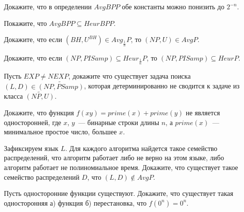 \setcounter{curtask}{18}


\begin{task}
    Докажите, что в определении $AvgBPP$ обе константы  можно понизить до $2^{-n}$.
\end{task}

\begin{task}
    Покажите, что $AvgBPP \subseteq HeurBPP$.
\end{task}

\begin{task}
    Докажите, что если $(BH, U^{BH}) \in Avg_{\frac{1}{n}}P$, то $(NP, U) \in AvgP$.
\end{task}

\begin{task}
    Докажите, что если $(NP, PISamp) \subseteq Heur_{\frac{1}{n}}P$, то $(NP, PISamp)
    \subseteq HeurP$.
\end{task}

\begin{task}
    Пусть $EXP \neq NEXP$, докажите что существует задача поиска $(L, D) \in
    \widetilde{(NP, PSamp)}$,
    которая детерминированно не сводится к задаче из класса $\widetilde{(NP, U)}$.
\end{task}

\breakline

\begin{ptask}{12}
    Докажите, что функция $f(xy) = prime(x) + prime(y)$ не является односторонней,
    где $x$, $y$~--- бинарные строки длины $n$, а $prime(x)$~--- минимальное простое
    число, большее $x$.
\end{ptask}

\begin{ptask}{14}
    Зафиксируем язык $L$. Для каждого алгоритма найдется такое семейство
    распределений, что алгоритм работает либо не верно на этом языке, либо алгоритм
    работает не полиномиальное время. Докажите, что существует такое семейство
    распределений $D$, что $(L, D) \notin AvgP$.
\end{ptask}

\begin{ptask}{17}
    Пусть односторонние функции существуют.
    Докажите, что существует такая односторонняя а) функция б) перестановка, что
    $f(0^n) = 0^n$.
\end{ptask}
